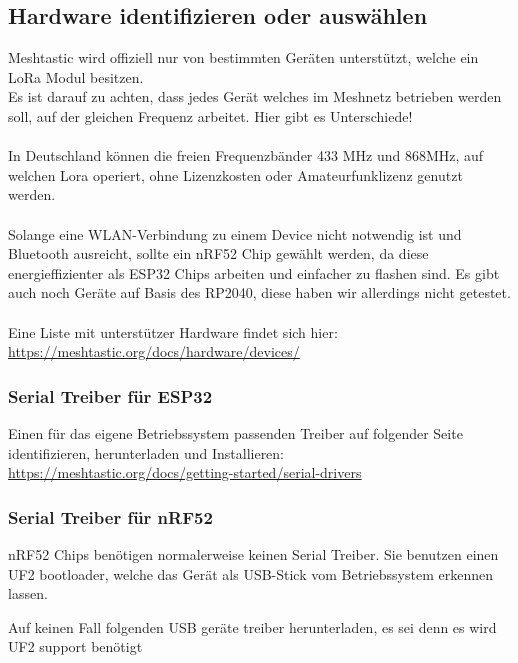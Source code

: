 \documentclass[12pt,a4paper]{article}
\begin{document}
\subsection{Hardware identifizieren oder auswählen}

Meshtastic wird offiziell nur von bestimmten Geräten unterstützt, welche ein LoRa Modul besitzen.
\\
Es ist darauf zu achten, dass jedes Gerät welches im Meshnetz betrieben werden soll, auf der gleichen Frequenz arbeitet. Hier gibt es Unterschiede!\\
\\
In Deutschland können die freien Frequenzbänder 433 MHz und 868MHz, auf welchen Lora operiert, ohne Lizenzkosten oder Amateurfunklizenz genutzt werden.\\
\\
Solange eine WLAN-Verbindung zu einem Device nicht notwendig ist und Bluetooth ausreicht, sollte ein nRF52 Chip gewählt werden,
da diese energieffizienter als ESP32 Chips arbeiten und einfacher zu flashen sind. Es gibt auch noch Geräte auf Basis des RP2040,
diese haben wir allerdings nicht getestet.\\
\\
Eine Liste mit unterstützer Hardware findet sich hier:\\
\url{https://meshtastic.org/docs/hardware/devices/}

\subsubsection{Serial Treiber für ESP32}
Einen für das eigene Betriebssystem passenden Treiber auf folgender Seite identifizieren, herunterladen und Installieren:
\\
\url{https://meshtastic.org/docs/getting-started/serial-drivers}

\subsubsection{Serial Treiber für nRF52}
nRF52 Chips benötigen normalerweise keinen Serial Treiber. Sie benutzen einen UF2 bootloader, welche das Gerät als USB-Stick vom Betriebssystem erkennen lassen.

Auf keinen Fall folgenden USB geräte treiber herunterladen, es sei denn es wird UF2 support benötigt
\end{document}
